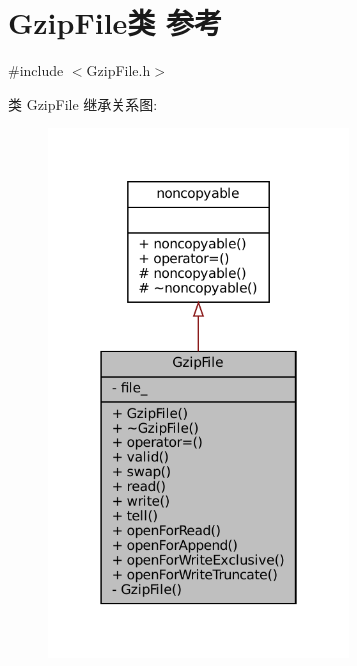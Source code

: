 \hypertarget{classmuduo_1_1GzipFile}{}\section{Gzip\+File类 参考}
\label{classmuduo_1_1GzipFile}


{\ttfamily \#include $<$Gzip\+File.\+h$>$}



类 Gzip\+File 继承关系图\+:
\nopagebreak
\begin{figure}[H]
\begin{center}
\leavevmode
\includegraphics[width=226pt]{classmuduo_1_1GzipFile__inherit__graph}
\end{center}
\end{figure}


